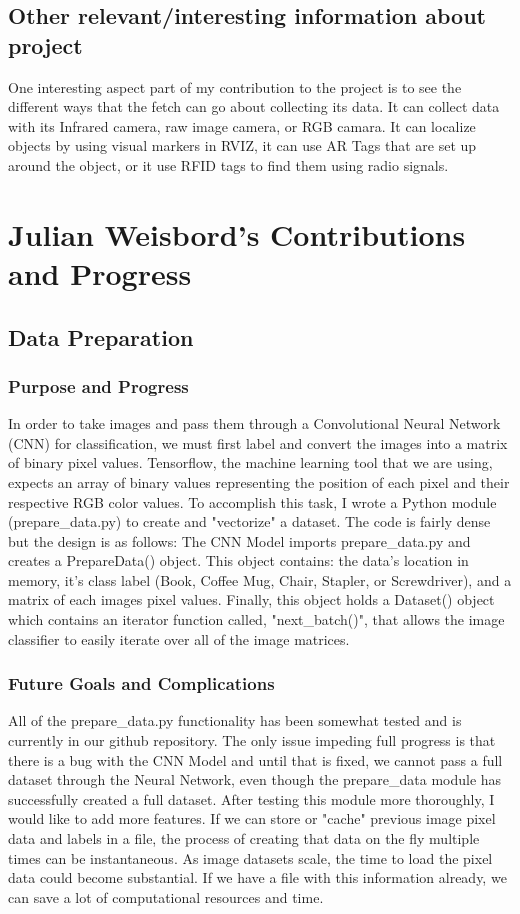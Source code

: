 \documentclass[draftclsnofoot, onecolumn, 10pt, compsoc]{IEEEtran}
\begin{document}
\subsection{Other relevant/interesting information about project}
One interesting aspect part of my contribution to the project is to see the different ways that the fetch can go about collecting its data. It can collect data with its Infrared camera, raw image camera, or RGB camara. It can localize objects by using visual markers in RVIZ, it can use AR Tags that are set up around the object, or it use RFID tags to find them using radio signals. 
\section{Julian Weisbord's Contributions and Progress}
\subsection{Data Preparation}
\subsubsection{Purpose and Progress}
In order to take images and pass them through a Convolutional Neural Network (CNN) for classification, we must first label and convert the images into a matrix of binary pixel values. Tensorflow, the machine learning tool that we are using, expects an array of binary values representing the position of each pixel and their respective RGB color values. To accomplish this task, I wrote a Python module (prepare\_data.py) to create and "vectorize" a  dataset. The code is fairly dense but the design is as follows: The CNN Model imports prepare\_data.py and creates a PrepareData() object. This object contains: the data's location in memory, it's class label (Book, Coffee Mug, Chair, Stapler, or Screwdriver), and a matrix of each images pixel values. Finally, this object holds a Dataset() object which contains an iterator function called, "next\_batch()", that allows the image classifier to easily iterate over all of the image matrices.

\subsubsection{Future Goals and Complications}
 All of the prepare\_data.py functionality has been somewhat tested and is currently in our github repository. The only issue impeding full progress is that there is a bug with the CNN Model and until that is fixed, we cannot pass a full dataset through the Neural Network, even though the prepare\_data module has successfully created a full dataset. After testing this module more thoroughly, I would like to add more features. If we can store or "cache" previous image pixel data and labels in a file, the process of creating that data on the fly multiple times can be instantaneous. As image datasets scale, the time to load the pixel data could become substantial. If we have a file with this information already, we can save a lot of computational resources and time.
\end{document}
